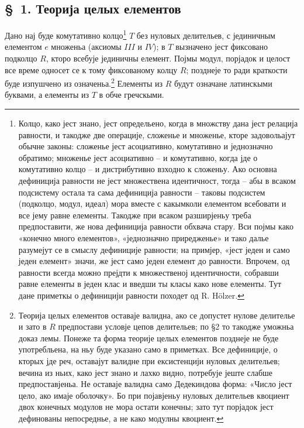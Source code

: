 ﻿\documentclass[11pt]{article}
\begin{document}
\setcounter{footnote}{5}

\subsection*{\S~1. Теорија целых елементов}

Дано нај буде комутативно колцо\footnote{Колцо, како јест знано, јест определьено, когда в множству дана јест релација равности, и такодже две операције, сложенье и множенье, кторе задовольајут обычне законы: сложенье јест асоциативно, комутативно и једнозначно обратимо; множенье јест асоциативно -- и комутативно, когда јде о комутативно колцо -- и дистрибутивно взходно к сложеньу. Ако основна дефиниција равности не јест множествена идентичност, тогда -- абы в всаком подсистему остала та сама дефиниција равности -- таковы подсистем (подколцо, модул, идеал) мора вместе с какымколи елементом всебовати и все јему равне елементы. Такодже при всаком разширјеньу треба предпоставити, же нова дефиниција равности обхвача стару. Вси појмы како «конечно много елементов», «једнозначно приредженье» и тако далье разумејут се в смыслу дефиниције равности; на примјер, «јест једен и само једен елемент» значи, же јест само једен елемент до равности. Впрочем, од равности всегда можно прејдти к множественој идентичности, собравши равне елементы в једен клас и введши ты класы како нове елементы. Тут дане приметкы о дефиницији равности походет од R. Hölzer.} $T$ без нуловых делительев, с јединичным елементом $e$ множеньа (аксиомы $III$ и $IV$); в $T$ вызначено јест фиксовано подколцо $R$, кторо всебује јединичны елемент. Појмы модул, порјадок и целост все време односет се к тому фиксованому колцу $R$; позднеје то ради краткости буде изпушчено из означеньа.\footnote{Теорија целых елементов оставаје валидна, ако се допустет нулове делителье и зато в $R$ предпостави условје цепов делительев; по §2 то такодже уможньа доказ лемы. Понеже та форма теорије целых елементов позднеје не буде употребльена, на ньу буде указано само в приметках. Все дефиниције, о кторых јде реч, оставајут валидне при ексистенцији нуловых делительев; вечина из ньих, како јест знано и лахко видно, потребује јеште слабше предпоставјеньа. Не оставаје валидна само Дедекиндова форма: «Число јест цело, ако имаје оболочку». Бо при појавјеньу нуловых делительев квоциент двох конечных модулов не мора остати конечны; зато тут порјадок јест дефинованы непосреднье, а не како модулны квоциент.} Елементы из $R$ будут означане латинскыми буквами, а елементы из $T$ в обче гречскыми.
\end{document}
